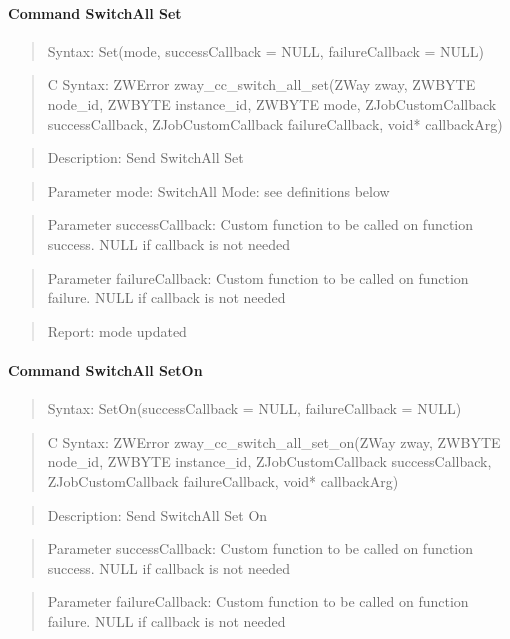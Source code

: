 \paragraph{Command SwitchAll Set}
\begin{quote}Syntax: Set(mode, successCallback = NULL, failureCallback = NULL)\end{quote}
\begin{quote}C Syntax: ZWError zway\_cc\_switch\_all\_set(ZWay zway, ZWBYTE node\_id, ZWBYTE instance\_id, ZWBYTE mode, ZJobCustomCallback successCallback, ZJobCustomCallback failureCallback, void* callbackArg)\end{quote}
\begin{quote}Description: Send SwitchAll Set\end{quote}
\begin{quote}Parameter mode: SwitchAll Mode: see definitions below\end{quote}
\begin{quote}Parameter successCallback: Custom function to be called on function success. NULL if callback is not needed\end{quote}
\begin{quote}Parameter failureCallback: Custom function to be called on function failure. NULL if callback is not needed\end{quote}
\begin{quote}Report: mode updated\end{quote}

\paragraph{Command SwitchAll SetOn}
\begin{quote}Syntax: SetOn(successCallback = NULL, failureCallback = NULL)\end{quote}
\begin{quote}C Syntax: ZWError zway\_cc\_switch\_all\_set\_on(ZWay zway, ZWBYTE node\_id, ZWBYTE instance\_id, ZJobCustomCallback successCallback, ZJobCustomCallback failureCallback, void* callbackArg)\end{quote}
\begin{quote}Description: Send SwitchAll Set On\end{quote}
\begin{quote}Parameter successCallback: Custom function to be called on function success. NULL if callback is not needed\end{quote}
\begin{quote}Parameter failureCallback: Custom function to be called on function failure. NULL if callback is not needed\end{quote}



